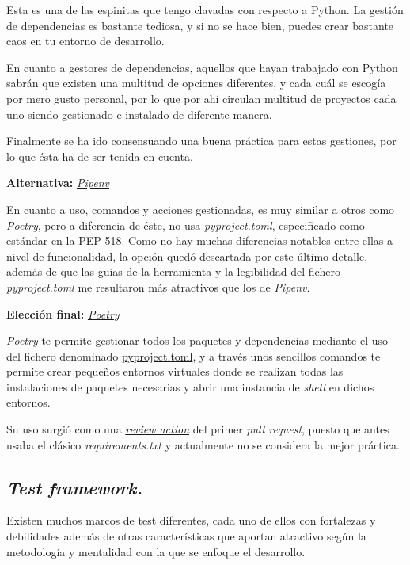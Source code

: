 Esta es una de las espinitas que tengo clavadas con respecto a Python. La gestión de dependencias es bastante tediosa, y si no se hace bien, puedes crear bastante caos en tu entorno de desarrollo.

En cuanto a gestores de dependencias, aquellos que hayan trabajado con Python sabrán que existen una multitud de opciones diferentes, y cada cuál se escogía por mero gusto personal, por lo que por ahí circulan multitud de proyectos cada uno siendo gestionado e instalado de diferente manera.

Finalmente se ha ido consensuando una buena práctica para estas gestiones, por lo que ésta ha de ser tenida en cuenta.

\textbf{Alternativa:} \href{https://pipenv-es.readthedocs.io/es/latest/}{\textit{Pipenv}}

En cuanto a uso, comandos y acciones gestionadas, es muy similar a otros como \textit{Poetry}, pero a diferencia de éste, no usa \textit{pyproject.toml}, especificado como estándar en la \href{https://peps.python.org/pep-0518/}{PEP-518}. Como no hay muchas diferencias notables entre ellas a nivel de funcionalidad, la opción quedó descartada por este último detalle, además de que las guías de la herramienta y la legibilidad del fichero \textit{pyproject.toml} me resultaron más atractivos que los de \textit{Pipenv}.

\textbf{Elección final:} \href{https://python-poetry.org/}{\textit{Poetry}}

\textit{Poetry} te permite gestionar todos los paquetes y dependencias mediante el uso del fichero denominado \href{https://github.com/Anglepi/My-Many-Reads/blob/main/pyproject.toml}{pyproject.toml}, y a través unos sencillos comandos te permite crear pequeños entornos virtuales donde se realizan todas las instalaciones de paquetes necesarias y abrir una instancia de \textit{shell} en dichos entornos.

Su uso surgió como una \href{https://github.com/Anglepi/My-Many-Reads/pull/39#discussion_r974230463}{\textit{review action}} del primer \textit{pull request}, puesto que antes usaba el clásico \textit{requirements.txt} y actualmente no se considera la mejor práctica.

\subsection{\textit{Test framework.}}

Existen muchos marcos de test diferentes, cada uno de ellos con fortalezas y debilidades además de otras características que aportan atractivo según la metodología y mentalidad con la que se enfoque el desarrollo.

